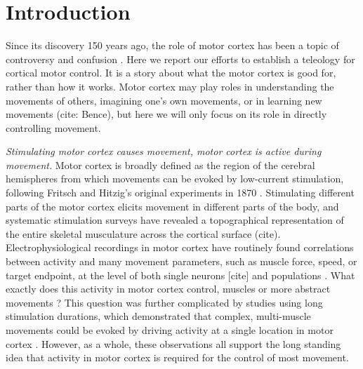 \section{Introduction}

Since its discovery 150 years ago, the role of motor cortex has been a topic of controversy and confusion \cite{Lashley1924}. Here we report our efforts to establish a teleology for cortical motor control. It is a story about what the motor cortex is good for, rather than how it works. Motor cortex may play roles in understanding the movements of others, imagining one's own movements, or in learning new movements (cite: Bence), but here we will only focus on its role in directly controlling movement.

\emph{Stimulating motor cortex causes movement, motor cortex is active during movement.}
Motor cortex is broadly defined as the region of the cerebral hemispheres from which movements can be evoked by low-current stimulation, following Fritsch and Hitzig's original experiments in 1870 \cite{Fritsch1870}. Stimulating different parts of the motor cortex elicits movement in different parts of the body, and systematic stimulation surveys have revealed a topographical representation of the entire skeletal musculature across the cortical surface (cite). Electrophysiological recordings in motor cortex have routinely found correlations between activity and many movement parameters, such as muscle force, speed, or target endpoint, at the level of both single neurons [cite] and populations \cite{Georgopoulos1986}. What exactly does this activity in motor cortex control, muscles or more abstract movements \cite{Todorov2000}? This question was further complicated by studies using long stimulation durations, which demonstrated that complex, multi-muscle movements could be evoked by driving activity at a single location in motor cortex \cite{Graziano2002,Aflalo2006}. However, as a whole, these observations all support the long standing idea that activity in motor cortex is required for the control of most movement. 


